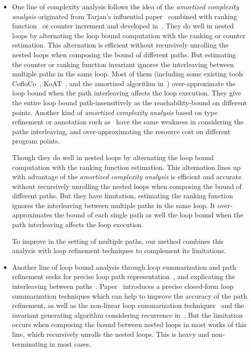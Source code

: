 \begin{itemize}
  \item 
  One line of complexity analysis follows the idea of the \emph{amortized complexity analysis} originated from Tarjan's influential paper~\cite{PotechinP17} combined with ranking function~\cite{BradleyMS05,CookSZ13,Zuleger18} or counter increment and developed in~\cite{ZulegerGSV11,SinnZV14,SinnZV17,LuCT21,AliasDFG10}.
  They do well in nested loops by alternating the loop bound computation with the ranking or counter estimation. This alternation is efficient without recursively unrolling the nested loops when composing the bound of different paths.
  But estimating the counter or ranking function invariant ignores the interleaving between multiple paths in the same loop.
  Most of them (including some existing tools CofloCo~\cite{Montoya17,Flores-MontoyaH14,Flores-Montoya16}, KoAT~\cite{BrockschmidtEFFG16,BrockschmidtEFFG14,FalkeKS12,FalkeKS11}, and the amortized algorithm in~\cite{LuCT21}) over-approximate the loop bound when the path interleaving affects the loop execution. They give the entire loop bound path-insensitively as the reachability-bound on different points. Another kind of \emph{amortized complexity analysis} based on type refinement or annotation such as~\cite{CraryW00,JostHLH10,CicekBG0H17,RajaniG0021,CarbonneauxHS15} have the same weakness in considering the paths interleaving, and over-approximating the resource cost on different program points.
    
  Though they do well in nested loops by alternating the loop bound computation with the ranking function estimation. This alternation lines up with advantage of the \emph{amortized complexity analysis} is efficient and accurate without recursively unrolling the nested loops when composing the bound of different paths.
  But they have limitation, estimating the ranking function ignores the interleaving between multiple paths in the same loop.
  It over-approximates the bound of each single path as well the loop bound when the path interleaving affects the loop execution.
  
  To improve in the setting of multiple paths, our method combines this analysis with loop refinement techniques to complement its limitations.
  \item 
  Another line of loop bound analysis through loop summarization and path refinement seeks for precise loop path representation~\cite{ManoliosV06,BalakrishnanSIG09,SharmaDDA11,Flores-MontoyaH14,HumenbergerJK18,CyphertBKR19}, and explicating the interleaving between paths~\cite{GulwaniJK09,ZulegerGSV11}.
  Paper~\cite{KincaidBCR19} introduces a precise closed-form loop summarization techniques which can help to improve the accuracy of the path refinement, as well as the non-linear loop summarization techniques~\cite{KincaidCBR18} and the invariant generating algorithm considering recurrence in~\cite{BreckCKR20}. 
  But the limitation occurs when composing the bound between nested loops in most works of this line, which recursively unrolls the nested loops. This is heavy and non-terminating in most cases.


\end{itemize}
